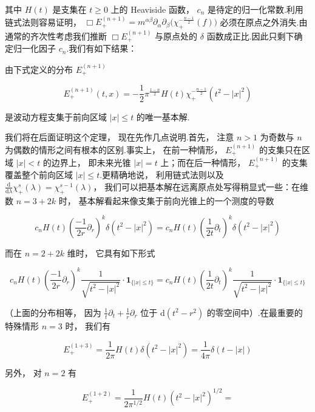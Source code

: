 其中 $H(t)$ 是支集在 $t \geq 0$ 上的 Heaviside 函数， $c_{n}$ 是待定的归一化常数.利用链式法则容易证明， $\Box E_{+}^{(n+1)} = m^{\alpha\beta}\partial_{\alpha}\partial_{\beta}\bigl(\chi_{+}^{-\frac{n-1}{2}}(f)\bigr)$ 必须在原点之外消失.由通常的齐次性考虑我们推断 $\Box E_{+}^{(n+1)}$ 与原点处的 $\delta$ 函数成正比.因此只剩下确定归一化因子 $c_{n}$.我们有如下结果：

\begin{theorem}\label{thm:c4-3.1}
由下式定义的分布 $E_{+}^{(n+1)}$

\begin{equation}
E_{+}^{(n+1)}(t, x) = -\frac{1}{2}\pi^{\frac{1-n}{2}}H(t)\chi_{+}^{-\frac{n-1}{2}}(t^{2}-|x|^{2})\label{eq:c4-141}
\end{equation}

是波动方程支集于前向区域 $|x| \leq t$ 的唯一基本解.
\end{theorem}

我们将在后面证明这个定理， 现在先作几点说明.首先， 注意 $n > 1$ 为奇数与 $n$ 为偶数的情形之间有根本的区别.事实上， 在前一种情形， $E_{+}^{(n+1)}$ 的支集只在区域 $|x| < t$ 的边界上， 即未来光锥 $|x| = t$ 上；而在后一种情形， $E_{+}^{(n+1)}$ 的支集覆盖整个前向区域 $|x| \leq t$.更精确地说， 利用链式法则以及 $\frac{\mathrm{d}}{\mathrm{d}\lambda}\chi_{+}^{s}(\lambda) = \chi_{+}^{s-1}(\lambda)$， 我们可以把基本解在远离原点处写得稍显式一些：在维数 $n = 3+2k$ 时， 基本解看起来像支集于前向光锥上的一个测度的导数

\[
c_{n}H(t)\left(\frac{-1}{2r}\partial_{r}\right)^{k}\delta(t^{2}-|x|^{2}) = c_{n}H(t)\left(\frac{1}{2t}\partial_{t}\right)^{k}\delta(t^{2}-|x|^{2})
\]

而在 $n = 2+2k$ 维时， 它具有如下形式

\[
c_{n}H(t)\left(\frac{-1}{2r}\partial_{r}\right)^{k}\frac{1}{\sqrt{t^{2}-|x|^{2}}}\cdot\mathbf{1}_{\{|x|\leq t\}} = c_{n}H(t)\left(\frac{1}{2t}\partial_{t}\right)^{k}\frac{1}{\sqrt{t^{2}-|x|^{2}}}\cdot\mathbf{1}_{\{|x|\leq t\}}
\]

（上面的分布相等， 因为 $\frac{1}{t}\partial_{t} + \frac{1}{r}\partial_{r}$ 位于 $\mathrm{d}(t^{2}-r^{2})$ 的零空间中）.在最重要的特殊情形 $n = 3$ 时， 我们有

\begin{equation}
E_{+}^{(1+3)} = \frac{1}{2\pi}H(t)\delta(t^{2}-|x|^{2}) = \frac{1}{4\pi}\delta(t-|x|)\label{eq:c4-142}
\end{equation}

另外， 对 $n = 2$ 有

\begin{equation}
E_{+}^{(1+2)} = \frac{1}{2\pi^{1/2}}H(t)(t^{2}-|x|^{2})^{1/2} =\label{eq:c4-143}
\end{equation}

